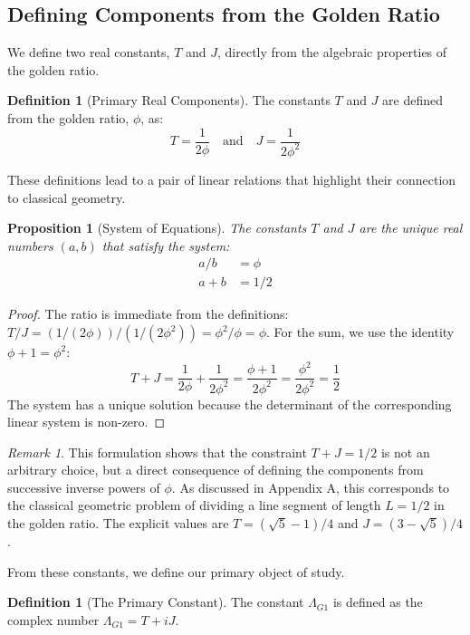\documentclass{amsart}
\theoremstyle{plain}
\newtheorem{proposition}[theorem]{Proposition}
\theoremstyle{definition}
\newtheorem{definition}[theorem]{Definition}
\theoremstyle{remark}
\newtheorem*{remark}{Remark}
\newcommand{\LambdaG}{\Lambda_{G1}}
\begin{document}
\subsection{Defining Components from the Golden Ratio}
We define two real constants, $T$ and $J$, directly from the algebraic properties of the golden ratio.

\begin{definition}[Primary Real Components]
The constants $T$ and $J$ are defined from the golden ratio, $\phi$, as:
$$ T = \frac{1}{2\phi} \quad \text{and} \quad J = \frac{1}{2\phi^2} $$
\end{definition}

These definitions lead to a pair of linear relations that highlight their connection to classical geometry.

\begin{proposition}[System of Equations]
The constants $T$ and $J$ are the unique real numbers $(a,b)$ that satisfy the system:
\begin{align}
    a/b &= \phi \label{eq:ratio} \\
    a+b &= 1/2 \label{eq:sum}
\end{align}
\end{proposition}
\begin{proof}
The ratio is immediate from the definitions: $T/J = (1/(2\phi))/(1/(2\phi^2)) = \phi^2/\phi = \phi$. For the sum, we use the identity $\phi+1 = \phi^2$:
$$ T+J = \frac{1}{2\phi} + \frac{1}{2\phi^2} = \frac{\phi+1}{2\phi^2} = \frac{\phi^2}{2\phi^2} = \frac{1}{2} $$
The system has a unique solution because the determinant of the corresponding linear system is non-zero.
\end{proof}

\begin{remark}
This formulation shows that the constraint $T+J=1/2$ is not an arbitrary choice, but a direct consequence of defining the components from successive inverse powers of $\phi$. As discussed in Appendix A, this corresponds to the classical geometric problem of dividing a line segment of length $L=1/2$ in the golden ratio. The explicit values are $T = (\sqrt{5}-1)/4$ and $J = (3-\sqrt{5})/4$.
\end{remark}

From these constants, we define our primary object of study.
\begin{definition}[The Primary Constant]
The constant $\LambdaG$ is defined as the complex number $\LambdaG = T+iJ$.
\end{definition}
\end{document}

